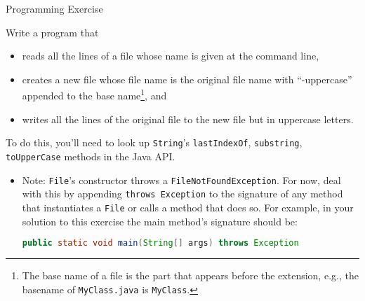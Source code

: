 \documentclass{beamer}
\begin{document}
\begin{frame}[fragile]{Programming Exercise}
 
Write a program that
\begin{itemize}
\item reads all the lines of a file whose name is given at the command line,
\item creates a new file whose file name is the original file name with ``-uppercase'' appended to the base name\footnote{The base name of a file is the part that appears before the extension, e.g., the basename of {\tt MyClass.java} is {\tt MyClass}.}, and
\item writes all the lines of the original file to the new file but in uppercase letters.
\end{itemize}
To do this, you'll need to look up {\tt String}'s {\tt lastIndexOf}, {\tt substring}, {\tt toUpperCase} methods in the Java API.

\begin{itemize}
\item Note: {\tt File}'s constructor throws a {\tt FileNotFoundException}.  For now, deal with this by appending {\tt throws Exception} to the signature of any method that instantiates a {\tt File} or calls a method that does so.  For example, in your solution to this exercise the main method's signature should be:
\begin{lstlisting}[language=Java]
public static void main(String[] args) throws Exception
\end{lstlisting}
\end{itemize}

\end{frame}





 

\end{document}
